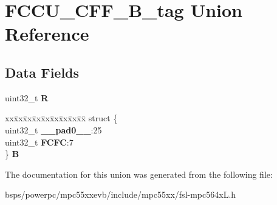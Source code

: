 \hypertarget{unionFCCU__CFF__32B__tag}{}\section{F\+C\+C\+U\+\_\+\+C\+F\+F\+\_\+B\+\_\+tag Union Reference}
\label{unionFCCU__CFF__32B__tag}
\subsection*{Data Fields}
\begin{DoxyCompactItemize}
\item 
\mbox{\label{unionFCCU__CFF__32B__tag_a1f1ec5c5e79b393fc75c217c0d13e243}} 
uint32\+\_\+t {\bfseries R}
\item 
\mbox{\label{unionFCCU__CFF__32B__tag_a76bf53314db64ef6d534f1921285ae54}} 
\begin{tabbing}
xx\=xx\=xx\=xx\=xx\=xx\=xx\=xx\=xx\=\kill
struct \{\\
\>uint32\_t {\bfseries \_\_pad0\_\_}:25\\
\>uint32\_t {\bfseries FCFC}:7\\
\} {\bfseries B}\\

\end{tabbing}\end{DoxyCompactItemize}


The documentation for this union was generated from the following file\+:\begin{DoxyCompactItemize}
\item 
bsps/powerpc/mpc55xxevb/include/mpc55xx/fsl-\/mpc564x\+L.\+h\end{DoxyCompactItemize}
